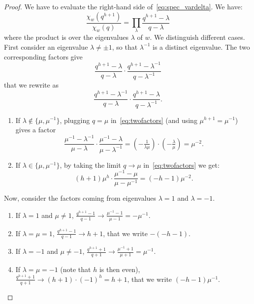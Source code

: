\documentclass[11pt]{article}
\theoremstyle{definition}
\begin{document}
\begin{proof}
    We have to evaluate the right-hand side of~\eqref{eq:spec_vardelta}.  We have:
    \[
        \frac{\chi_w(q^{h+1})}{\chi_w(q)}
            =
        \prod_\lambda \frac{q^{h+1}-\lambda}{q-\lambda}
    \]
    where the product is over the eigenvalues $\lambda$ of $w$.  We distinguish different cases.  First consider an eigenvalue $\lambda \neq \pm 1$, so that $\lambda^{-1}$ is a distinct eigenvalue. The two corresponding factors give
    \[
        \frac{q^{h+1}-\lambda}{q-\lambda} \cdot 
        \frac{q^{h+1}-\lambda^{-1}}{q-\lambda^{-1}}
    \]
    that we rewrite as
    \begin{equation} \label{eq:twofactors}
        \frac{q^{h+1}-\lambda^{-1}}{q-\lambda} \cdot 
        \frac{q^{h+1}-\lambda}{q-\lambda^{-1}}.
    \end{equation}
    \begin{enumerate}[label=(\roman*)]
        \item If $\lambda \notin \{\mu,\mu^{-1}\}$, plugging $q=\mu$ in~\eqref{eq:twofactors} (and using $\mu^{h+1} = \mu^{-1}$) gives  a factor
        \[
            \frac{\mu^{-1}-\lambda^{-1}}{\mu-\lambda} \cdot \frac{\mu^{-1}-\lambda}{\mu-\lambda^{-1}} 
                =
            (-\tfrac{1}{\lambda\mu}) \cdot (-\tfrac{\lambda}{\mu})
                =
            \mu^{-2}.
        \]
        \item If $\lambda \in \{ \mu, \mu^{-1} \}$, by taking the limit $q\to \mu$ in~\eqref{eq:twofactors} we get:
        \[
            (h+1) \mu^h \cdot \frac{\mu^{-1}-\mu}{\mu-\mu^{-1}} 
                = 
            (-h-1) \mu^{-2}.
        \]
    \end{enumerate}
    Now, consider the factors coming from eigenvalues $\lambda = 1$ and $\lambda = -1$. 
    \begin{enumerate}[label=(\roman*),start=3]
        \item If $\lambda=1$ and $\mu \neq 1$, $\frac{q^{h+1}-1}{q-1} \to \frac{\mu^{-1}-1}{\mu-1} = -\mu^{-1}$.
        \item If $\lambda= \mu = 1$, $\frac{q^{h+1}-1}{q-1} \to h+1$, that we write $-(-h-1)$.
        \item If $\lambda=-1$ and $\mu \neq -1$, $\frac{q^{h+1}+1}{q+1} \to \frac{\mu^{-1}+1}{\mu+1} = \mu^{-1}$.
        \item If $\lambda=\mu = -1$ (note that $h$ is then even), $\frac{q^{h+1}+1}{q+1} \to (h+1)\cdot (-1)^h = h+1$, that we write $(-h-1) \mu^{-1}$.
    \end{enumerate}

\end{proof}
\end{document}
